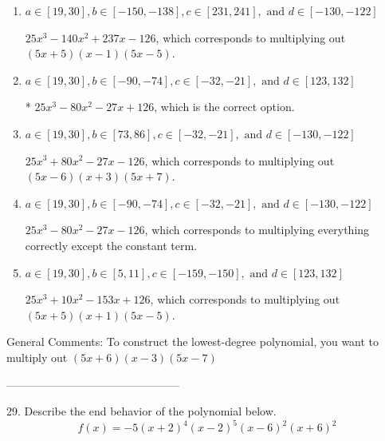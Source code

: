 \documentclass{extbook}[14pt]
\begin{document}
\begin{enumerate}[label=\Alph*.] 
\item $ a \in [19, 30], b \in [-150, -138], c \in [231, 241], \text{ and } d \in [-130, -122] $ 

 $25x^{3} -140 x^{2} +237 x -126$, which corresponds to multiplying out $(5x + 5)(x -1)(5x -5)$. 
\item $ a \in [19, 30], b \in [-90, -74], c \in [-32, -21], \text{ and } d \in [123, 132] $ 

 * $25x^{3} -80 x^{2} -27 x + 126$, which is the correct option. 
\item $ a \in [19, 30], b \in [73, 86], c \in [-32, -21], \text{ and } d \in [-130, -122] $ 

 $25x^{3} +80 x^{2} -27 x -126$, which corresponds to multiplying out $(5x -6)(x + 3)(5x + 7)$. 
\item $ a \in [19, 30], b \in [-90, -74], c \in [-32, -21], \text{ and } d \in [-130, -122] $ 

 $25x^{3} -80 x^{2} -27 x -126$, which corresponds to multiplying everything correctly except the constant term. 
\item $ a \in [19, 30], b \in [5, 11], c \in [-159, -150], \text{ and } d \in [123, 132] $ 

 $25x^{3} +10 x^{2} -153 x + 126$, which corresponds to multiplying out $(5x + 5)(x + 1)(5x -5)$. 
\end{enumerate} 
 
General Comments: To construct the lowest-degree polynomial, you want to multiply out $(5x + 6)(x -3)(5x -7)$

-----------------------------------------------

29. Describe the end behavior of the polynomial below.
\[ f(x) = -5(x + 2)^{4}(x - 2)^{5}(x - 6)^{2}(x + 6)^{2} \] 
\end{document}
